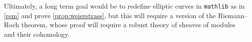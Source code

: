\documentclass[a4paper,UKenglish,cleveref,autoref,thm-restate]{lipics-v2021}
\begin{document}
Ultimately, a long term goal would be to redefine elliptic curves in \texttt{mathlib} as in \cref{rem} and prove \cref{prop:weierstrass}, but this will require a version of the Riemann--Roch theorem, whose proof will require a robust theory of sheaves of modules and their cohomology.

\pagebreak


\end{document}

